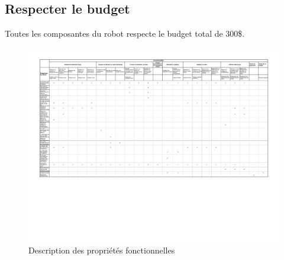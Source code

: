 \subsection{Respecter le budget}

Toutes les composantes du robot respecte le budget total de 300\$.


\begin{landscape}
  \begin{center}
    \begin{figure}[h]
      \label{annexe_dpf}
      \centering
      \includegraphics[scale=0.85]{resources/dpf.pdf}
      \caption{Description des propriétés fonctionnelles}
    \end{figure}
  \end{center}
\end{landscape}